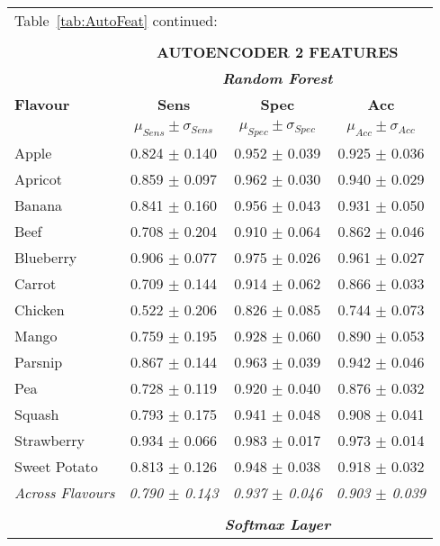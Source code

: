 \documentclass[authoryear]{elsarticle}
\begin{document}
	\begin{tabular}{lccc}
	\multicolumn{4}{l}{Table~\ref{tab:AutoFeat} continued:}\\
	\multicolumn{4}{c}{}\\   
    \toprule
          & \multicolumn{3}{c}{\textbf{AUTOENCODER 2 FEATURES}} \\
          & \multicolumn{3}{c}{\textit{\textbf{Random Forest}}} \\
    \midrule
    \textbf{Flavour} & \textbf{Sens} & \textbf{Spec} & \textbf{Acc}\\
    & $\mu_{Sens} \pm \sigma_{Sens}$ & $\mu_{Spec} \pm \sigma_{Spec}$ & $\mu_{Acc} \pm \sigma_{Acc}$ \\
    \midrule
    Apple 		 & 0.824 $\pm$ 0.140 & 0.952 $\pm$ 0.039 & 0.925 $\pm$ 0.036 \\
    Apricot 	 & 0.859 $\pm$ 0.097 & 0.962 $\pm$ 0.030 & 0.940 $\pm$ 0.029 \\
    Banana 		 & 0.841 $\pm$ 0.160 & 0.956 $\pm$ 0.043 & 0.931 $\pm$ 0.050 \\
    Beef 		 & 0.708 $\pm$ 0.204 & 0.910 $\pm$ 0.064 & 0.862 $\pm$ 0.046 \\
    Blueberry 	 & 0.906 $\pm$ 0.077 & 0.975 $\pm$ 0.026 & 0.961 $\pm$ 0.027 \\
    Carrot 		 & 0.709 $\pm$ 0.144 & 0.914 $\pm$ 0.062 & 0.866 $\pm$ 0.033 \\
    Chicken 	 & 0.522 $\pm$ 0.206 & 0.826 $\pm$ 0.085 & 0.744 $\pm$ 0.073 \\
    Mango 		 & 0.759 $\pm$ 0.195 & 0.928 $\pm$ 0.060 & 0.890 $\pm$ 0.053 \\
    Parsnip 	 & 0.867 $\pm$ 0.144 & 0.963 $\pm$ 0.039 & 0.942 $\pm$ 0.046 \\
    Pea 		 & 0.728 $\pm$ 0.119 & 0.920 $\pm$ 0.040 & 0.876 $\pm$ 0.032 \\
    Squash 		 & 0.793 $\pm$ 0.175 & 0.941 $\pm$ 0.048 & 0.908 $\pm$ 0.041 \\
    Strawberry 	 & 0.934 $\pm$ 0.066 & 0.983 $\pm$ 0.017 & 0.973 $\pm$ 0.014 \\
    Sweet Potato & 0.813 $\pm$ 0.126 & 0.948 $\pm$ 0.038 & 0.918 $\pm$ 0.032 \\
    \midrule
    \textit{Across Flavours} & \textit{0.790 $\pm$ 0.143} & \textit{0.937 $\pm$ 0.046} & \textit{0.903 $\pm$ 0.039} \\
    \midrule
    \multicolumn{4}{c}{}\\
    \midrule
          & \multicolumn{3}{c}{\textit{\textbf{Softmax Layer}}} \\

\end{tabular}
\end{document}
